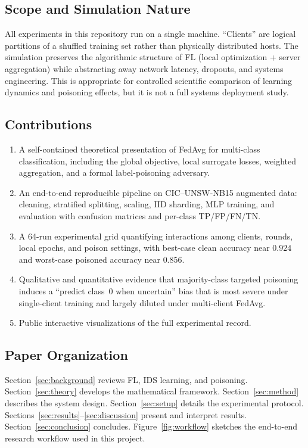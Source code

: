 \documentclass[journal]{IEEEtran}
\begin{document}
\subsection{Scope and Simulation Nature}
All experiments in this repository run on a single machine. ``Clients'' are logical partitions of a shuffled training set rather than physically distributed hosts. The simulation preserves the algorithmic structure of FL (local optimization + server aggregation) while abstracting away network latency, dropouts, and systems engineering. This is appropriate for controlled scientific comparison of learning dynamics and poisoning effects, but it is not a full systems deployment study.

\subsection{Contributions}
\begin{enumerate}
\item A self-contained theoretical presentation of FedAvg for multi-class classification, including the global objective, local surrogate losses, weighted aggregation, and a formal label-poisoning adversary.
\item An end-to-end reproducible pipeline on CIC--UNSW-NB15 augmented data: cleaning, stratified splitting, scaling, IID sharding, MLP training, and evaluation with confusion matrices and per-class TP/FP/FN/TN.
\item A 64-run experimental grid quantifying interactions among clients, rounds, local epochs, and poison settings, with best-case clean accuracy near $0.924$ and worst-case poisoned accuracy near $0.856$.
\item Qualitative and quantitative evidence that majority-class targeted poisoning induces a ``predict class~0 when uncertain'' bias that is most severe under single-client training and largely diluted under multi-client FedAvg.
\item Public interactive visualizations of the full experimental record.
\end{enumerate}

\subsection{Paper Organization}
Section~\ref{sec:background} reviews FL, IDS learning, and poisoning. Section~\ref{sec:theory} develops the mathematical framework. Section~\ref{sec:method} describes the system design. Section~\ref{sec:setup} details the experimental protocol. Sections~\ref{sec:results}--\ref{sec:discussion} present and interpret results. Section~\ref{sec:conclusion} concludes. Figure~\ref{fig:workflow} sketches the end-to-end research workflow used in this project.
\end{document}
